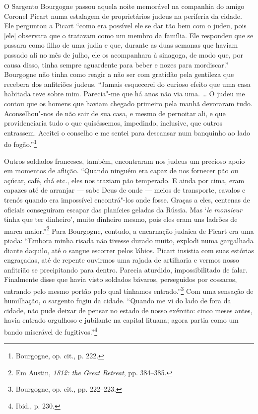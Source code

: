 %

O Sargento Bourgogne passou aquela noite memorável na companhia do amigo
Coronel Picart numa estalagem de proprietários judeus na periferia da
cidade. Ele perguntou a Picart ``como era possível ele se dar tão bem
com o judeu, pois {[}ele{]} observara que o tratavam como um membro da
família. Ele respondeu que se passara como filho de uma judia e que,
durante as duas semanas que haviam passado ali no mês de julho, ele os
acompanhara à sinagoga, de modo que, por causa disso, tinha sempre
aguardente para beber e nozes para mordiscar.'' Bourgogne não tinha como
reagir a não ser com gratidão pela gentileza que recebera dos anfitriões
judeus. ``Jamais esquecerei do curioso efeito que uma casa habitada teve
sobre mim. Parecia"-me que há anos não via uma. \ldots{} O judeu me
contou que os homens que haviam chegado primeiro pela manhã devoraram
tudo. Aconselhou"-nos de não sair de sua casa, e mesmo de pernoitar ali,
e que providenciaria tudo o que quiséssemos, impedindo, inclusive, que
outros entrassem. Aceitei o conselho e me sentei para descansar num
banquinho ao lado do fogão.''\footnote{Bourgogne, op. cit., p. 222.}

Outros soldados franceses, também, encontraram nos judeus um precioso
apoio em momentos de aflição. ``Quando ninguém era capaz de nos fornecer
pão ou açúcar, café, chá etc., eles nos traziam pão temperado. E ainda
por cima, eram capazes até de arranjar --- sabe Deus de onde --- meios de
transporte, cavalos e trenós quando era impossível encontrá"-los onde
fosse. Graças a eles, centenas de oficiais conseguiram escapar das
planícies geladas da Rússia. Mas `\emph{le monsieur} tinha que ter
dinheiro', muito dinheiro mesmo, pois eles eram uns ladrões de marca
maior.''\footnote{Em Austin, \emph{1812: the Great Retreat}, pp.
  384--385.} Para Bourgogne, contudo, a encarnação judaica de Picart era
uma piada: ``Embora minha risada não tivesse durado muito, explodi numa
gargalhada diante daquilo, até o sangue escorrer pelos lábios. Picart
insistia com suas estórias engraçadas, até de repente ouvirmos uma
rajada de artilharia e vermos nosso anfitrião se precipitando para
dentro. Parecia aturdido, impossibilitado de falar. Finalmente disse que
havia visto soldados bávaros, perseguidos por cossacos, entrando pelo
mesmo portão pelo qual tínhamos entrado.''\footnote{Bourgogne, op. cit.,
  pp. 222--223.} Com uma sensação de humilhação, o sargento fugiu da
cidade. ``Quando me vi do lado de fora da cidade, não pude deixar de
pensar no estado de nosso exército: cinco meses antes, havia entrado
orgulhoso e jubilante na capital lituana; agora partia como um bando
miserável de fugitivos.''\footnote{Ibid., p. 230.}

